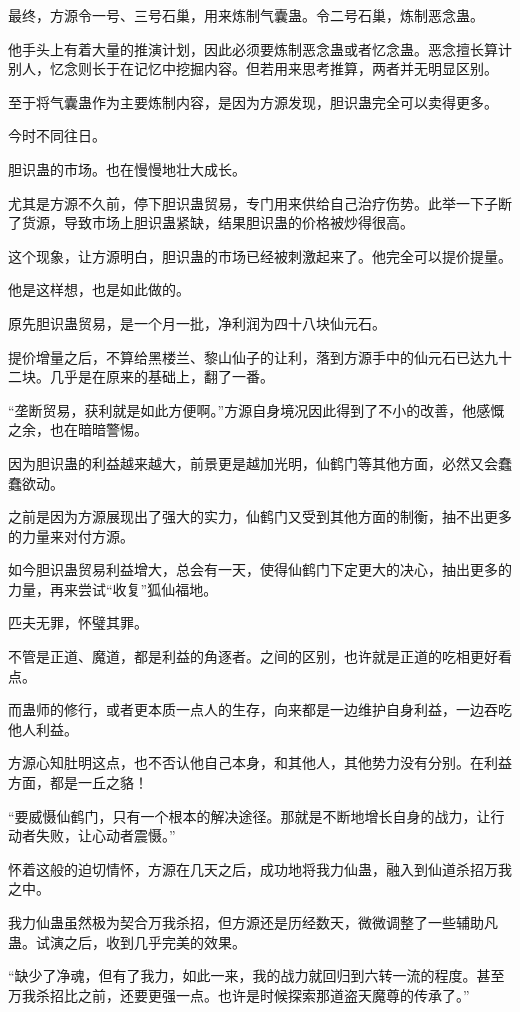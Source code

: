 \begin{this_body}
最终，方源令一号、三号石巢，用来炼制气囊蛊。令二号石巢，炼制恶念蛊。

他手头上有着大量的推演计划，因此必须要炼制恶念蛊或者忆念蛊。恶念擅长算计别人，忆念则长于在记忆中挖掘内容。但若用来思考推算，两者并无明显区别。

至于将气囊蛊作为主要炼制内容，是因为方源发现，胆识蛊完全可以卖得更多。

今时不同往日。

胆识蛊的市场。也在慢慢地壮大成长。

尤其是方源不久前，停下胆识蛊贸易，专门用来供给自己治疗伤势。此举一下子断了货源，导致市场上胆识蛊紧缺，结果胆识蛊的价格被炒得很高。

这个现象，让方源明白，胆识蛊的市场已经被刺激起来了。他完全可以提价提量。

他是这样想，也是如此做的。

原先胆识蛊贸易，是一个月一批，净利润为四十八块仙元石。

提价增量之后，不算给黑楼兰、黎山仙子的让利，落到方源手中的仙元石已达九十二块。几乎是在原来的基础上，翻了一番。

“垄断贸易，获利就是如此方便啊。”方源自身境况因此得到了不小的改善，他感慨之余，也在暗暗警惕。

因为胆识蛊的利益越来越大，前景更是越加光明，仙鹤门等其他方面，必然又会蠢蠢欲动。

之前是因为方源展现出了强大的实力，仙鹤门又受到其他方面的制衡，抽不出更多的力量来对付方源。

如今胆识蛊贸易利益增大，总会有一天，使得仙鹤门下定更大的决心，抽出更多的力量，再来尝试“收复”狐仙福地。

匹夫无罪，怀璧其罪。

不管是正道、魔道，都是利益的角逐者。之间的区别，也许就是正道的吃相更好看点。

而蛊师的修行，或者更本质一点人的生存，向来都是一边维护自身利益，一边吞吃他人利益。

方源心知肚明这点，也不否认他自己本身，和其他人，其他势力没有分别。在利益方面，都是一丘之貉！

“要威慑仙鹤门，只有一个根本的解决途径。那就是不断地增长自身的战力，让行动者失败，让心动者震慑。”

怀着这般的迫切情怀，方源在几天之后，成功地将我力仙蛊，融入到仙道杀招万我之中。

我力仙蛊虽然极为契合万我杀招，但方源还是历经数天，微微调整了一些辅助凡蛊。试演之后，收到几乎完美的效果。

“缺少了净魂，但有了我力，如此一来，我的战力就回归到六转一流的程度。甚至万我杀招比之前，还要更强一点。也许是时候探索那道盗天魔尊的传承了。”


\end{this_body}

